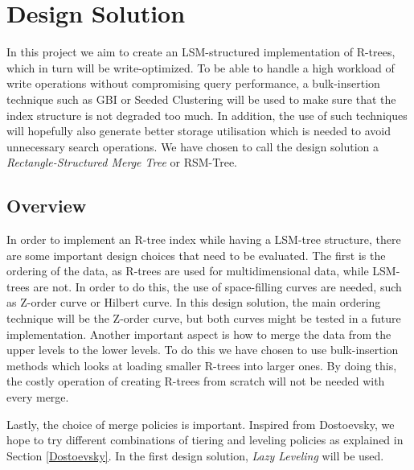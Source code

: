 \chapter{Design Solution}
\label{chap:design}
In this project we aim to create an LSM-structured implementation of R-trees, which in turn will be write-optimized. To be able to handle a high workload of write operations without compromising query performance, a bulk-insertion technique such as GBI\cite{GBI} or Seeded Clustering\cite{SeededClustering} will be used to make sure that the index structure is not degraded too much. In addition, the use of such techniques will hopefully also generate better storage utilisation which is needed to avoid unnecessary search operations. We have chosen to call the design solution a \emph{Rectangle-Structured Merge Tree} or RSM-Tree.

\section{Overview}
In order to implement an R-tree index while having a LSM-tree structure, there are some important design choices that need to be evaluated. The first is the ordering of the data, as R-trees are used for multidimensional data, while LSM-trees are not. In order to do this, the use of space-filling curves are needed, such as Z-order curve or Hilbert curve. In this design solution, the main ordering technique will be the Z-order curve, but both curves might be tested in a future implementation. Another important aspect is how to merge the data from the upper levels to the lower levels. To do this we have chosen to use bulk-insertion methods which looks at loading smaller R-trees into larger ones. By doing this, the costly operation of creating R-trees from scratch will not be needed with every merge.\newline

\noindent
Lastly, the choice of merge policies is important. Inspired from Dostoevsky\cite{Dostoevsky}, we hope to try different combinations of tiering and leveling policies as explained in Section \ref{Dostoevsky}. In the first design solution, \emph{Lazy Leveling} will be used.  

